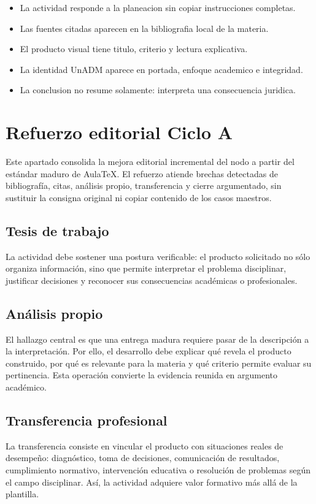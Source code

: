 \documentclass[
  spanish,
  letterpaper, oneside
]{article}
\begin{document}
\begin{itemize}
  \item La actividad responde a la planeacion sin copiar instrucciones completas.
  \item Las fuentes citadas aparecen en la bibliografia local de la materia.
  \item El producto visual tiene titulo, criterio y lectura explicativa.
  \item La identidad UnADM aparece en portada, enfoque academico e integridad.
  \item La conclusion no resume solamente: interpreta una consecuencia juridica.
\end{itemize}

\section*{Refuerzo editorial Ciclo A}
Este apartado consolida la mejora editorial incremental del nodo a partir del estándar maduro de AulaTeX. El refuerzo atiende brechas detectadas de bibliografía, citas, análisis propio, transferencia y cierre argumentado, sin sustituir la consigna original ni copiar contenido de los casos maestros.

\subsection*{Tesis de trabajo}
La actividad debe sostener una postura verificable: el producto solicitado no sólo organiza información, sino que permite interpretar el problema disciplinar, justificar decisiones y reconocer sus consecuencias académicas o profesionales.

\subsection*{Análisis propio}
El hallazgo central es que una entrega madura requiere pasar de la descripción a la interpretación. Por ello, el desarrollo debe explicar qué revela el producto construido, por qué es relevante para la materia y qué criterio permite evaluar su pertinencia. Esta operación convierte la evidencia reunida en argumento académico.

\subsection*{Transferencia profesional}
La transferencia consiste en vincular el producto con situaciones reales de desempeño: diagnóstico, toma de decisiones, comunicación de resultados, cumplimiento normativo, intervención educativa o resolución de problemas según el campo disciplinar. Así, la actividad adquiere valor formativo más allá de la plantilla.
\end{document}
